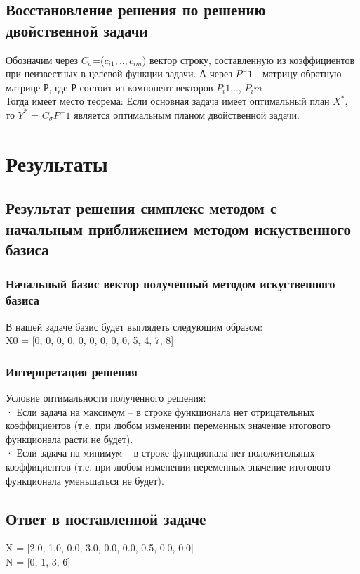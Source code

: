 \documentclass[a4]{article}
\begin{document}
		\subsection{Восстановление решения по решению двойственной задачи}
			Обозначим через $C_\sigma$=($c_{i1}, .. , c_{im}$) вектор строку, составленную из коэффициентов при неизвестных в целевой функции задачи. А через $P^-1$ - матрицу обратную матрице Р, где Р состоит из компонент векторов $P_i1$,.., $P_im$\\
			Тогда имеет место теорема: Если основная задача имеет оптимальный план $X^*$, то $Y^*$ = $C_\sigma P^-1$ является оптимальным планом двойственной задачи.
	\section{Результаты}
		\subsection{Результат решения симплекс методом с начальным приближением методом искуственного базиса}
			\subsubsection{Начальный базис вектор полученный методом искуственного базиса}
				В нашей задаче базис будет выглядеть следующим образом:\\
				X0 = [0, 0, 0, 0, 0, 0, 0, 0, 0, 5, 4, 7, 8]
			\subsubsection{Интерпретация решения}
				Условие оптимальности полученного решения:\\
				· Если задача на максимум – в строке функционала нет отрицательных коэффициентов (т.е. при любом изменении переменных значение итогового функционала расти не будет).\\
				· Если задача на минимум – в строке функционала нет положительных коэффициентов (т.е. при любом изменении переменных значение итогового функционала уменьшаться не будет).
			
			\subsection{Ответ в поставленной задаче}
				X = [2.0, 1.0, 0.0, 3.0, 0.0, 0.0, 0.5, 0.0, 0.0]\\
				
				N = [0, 1, 3, 6]\\
				
\end{document}
